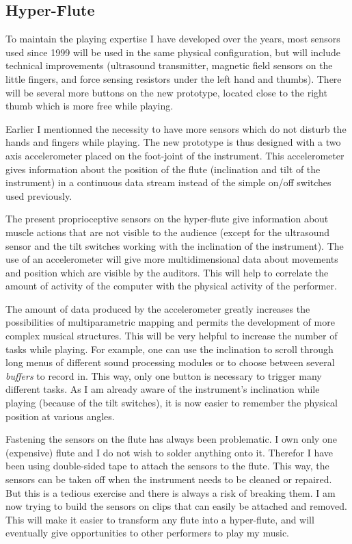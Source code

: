 \subsection{Hyper-Flute}

To maintain the playing expertise I have developed over the years, most sensors used since 1999 will be used in the same physical configuration, but will include technical improvements (ultrasound transmitter, magnetic field sensors on the little fingers, and force sensing resistors under the left hand and thumbs). There will be several more buttons on the new prototype, located close to the right thumb which is more free while playing.

Earlier I mentionned the necessity to have more sensors which do not disturb the hands and fingers while playing. The new prototype is thus designed with a two axis accelerometer placed on the foot-joint of the instrument. This accelerometer gives information about the position of the flute (inclination and tilt of the instrument) in a continuous data stream instead of the simple on/off switches used previously.

The present proprioceptive sensors on the hyper-flute give information about muscle actions that are not visible to the audience (except for the ultrasound sensor and the tilt switches working with the inclination of the instrument). The use of an accelerometer will give more multidimensional data about movements and position which are visible by the auditors. This will help to correlate the amount of activity of the computer with the physical activity of the performer. 

The amount of data produced by the accelerometer greatly increases the possibilities of multiparametric mapping and permits the development of more complex musical structures. This will be very helpful to increase the number of tasks while playing. For example, one can use the inclination to scroll through long menus of different sound processing modules or to choose between several \emph{buffers} to record in. This way, only one button is necessary to trigger many different tasks. As I am already aware of the instrument's inclination while playing (because of the tilt switches), it is now easier to remember the physical position at various angles.

Fastening the sensors on the flute has always been problematic. I own only one (expensive) flute and I do not wish to solder anything onto it. Therefor I have been using double-sided tape to attach the sensors to the flute. This way, the sensors can be taken off when the instrument needs to be cleaned or repaired. But this is a tedious exercise and there is always a risk of breaking them. I am now trying to build the sensors on clips that can easily be attached and removed. This will make it easier to transform any flute into a hyper-flute, and will eventually give opportunities to other performers to play my music.

